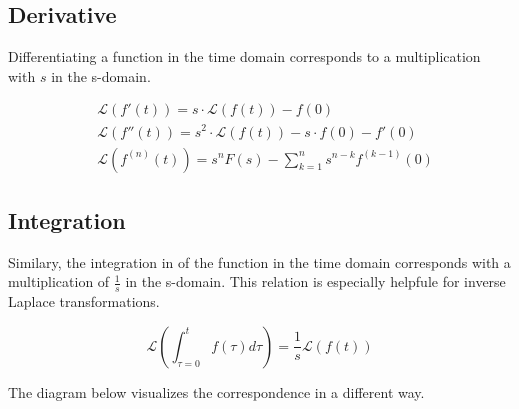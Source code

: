 \documentclass[./\jobname.tex]{subfiles}
\begin{document}
\subsection{Derivative}
\label{chap:derivative}

Differentiating a function in the time domain corresponds to a multiplication with $s$ in the s-domain. 

\begin{equation}
	\begin{split}
		& \mathcal{L} \left( f'(t) \right) = s \cdot \mathcal{L} \left( f(t) \right) - f(0) \\
		& \mathcal{L} \left( f''(t) \right) =  s^2 \cdot \mathcal{L} \left( f(t) \right) - s \cdot f(0) - f'(0) \\
		& \mathcal{L} \left( f^{(n)}(t) \right) = s^n F(s) - \sum_{k=1}^{n} s^{n-k} f^{(k-1)}(0)
	\end{split}
\end{equation}

\subsection{Integration}

Similary, the integration in of the function in the time domain corresponds with a multiplication of $\frac{1}{s}$ in the s-domain. This relation is especially helpfule for inverse Laplace transformations.

\begin{equation}
	\mathcal{L}\left( \int_{\tau=0}^{t} f(\tau) d\tau \right) = \frac{1}{s} \mathcal{L} \left( f(t) \right)
\end{equation}

The diagram below visualizes the correspondence in a different way. 
\end{document}
